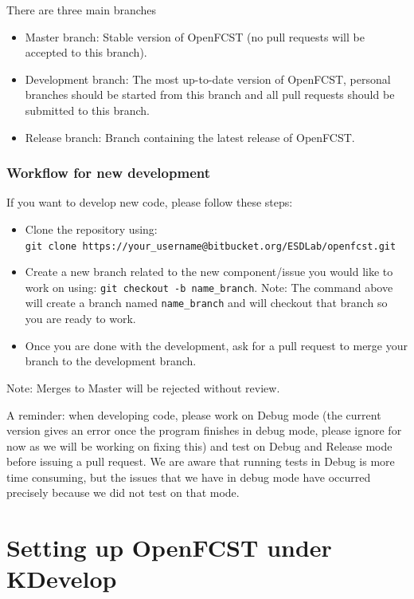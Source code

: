  
There are three main branches  
\begin{itemize}
 \item Master branch: Stable version of OpenFCST (no pull requests will be accepted to this branch).
 \item Development branch: The most up-to-date version of OpenFCST, personal branches should be started from this branch and all pull requests should be submitted to this branch.
 \item Release branch: Branch containing the latest release of OpenFCST.
\end{itemize}

\subsubsection{Workflow for new development}

If you want to develop new code, please follow these steps: 
\begin{itemize}
 \item Clone the repository using:\\
  \texttt{git clone https://your\_username@bitbucket.org/ESDLab/openfcst.git}
 \item Create a new branch related to the new component/issue you would like to work on using: \texttt{git checkout -b name\_branch}. Note: The command above will create a branch named \texttt{name\_branch} and will checkout that branch so you are ready to work.
 \item Once you are done with the development, ask for a pull request to merge your branch to the development branch.
\end{itemize}
Note: Merges to Master will be rejected without review.

A reminder: when developing code, please work on Debug mode (the current version gives an error once the program finishes in debug mode, please ignore for now as we will be working on fixing this) and test on Debug and Release mode before issuing a pull request. We are aware that running tests in Debug is more time consuming, but the issues that we have in debug mode have occurred precisely because we did not test on that mode.


\section{Setting up OpenFCST under KDevelop} \label{setting_up_fcst}


